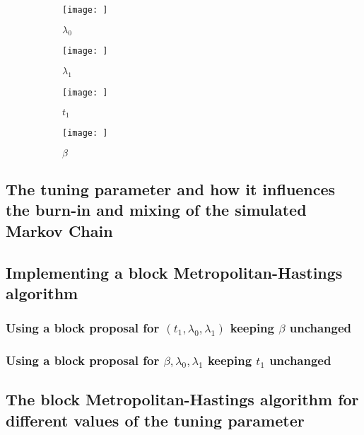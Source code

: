 \begin{figure}
    \centering
    \begin{subfigure}
     \centering
        \texttt{[image: ]}
        \caption{$\lambda_0$}
        \label{fig:burn_in_lam0}
    \end{subfigure}
    \begin{subfigure}
    \centering
        \texttt{[image: ]}
        \caption{$\lambda_1$}
        \label{fig:burn_in_lam1}
    \end{subfigure}
    \begin{subfigure}
    \centering
        \texttt{[image: ]}
        \caption{$t_1$}
        \label{fig:burn_in_t}
    \end{subfigure}
    \begin{subfigure}
    \centering
        \texttt{[image: ]}
        \caption{$\beta$}
        \label{fig:burn_in_beta}
    \end{subfigure}
    \caption{}
    \label{fig:burn_in}
\end{figure}



\subsection{The tuning parameter and how it influences the burn-in and mixing of the simulated Markov Chain}

\subsection{Implementing a block Metropolitan-Hastings algorithm}

\subsubsection{Using a block proposal for $(t_1, \lambda_0, \lambda_1)$ keeping $\beta$ unchanged}

\subsubsection{Using a block proposal for $\beta, \lambda_0, \lambda_1$ keeping $t_1$ unchanged}

\subsection{The block Metropolitan-Hastings algorithm for different values of the tuning parameter}